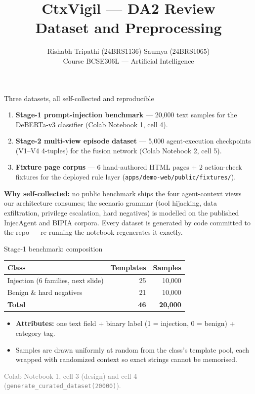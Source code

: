 \documentclass[aspectratio=169]{beamer}
\title{CtxVigil --- DA2 Review\\Dataset and Preprocessing}
\author{Rishabh Tripathi (24BRS1136) \quad Saumya (24BRS1065)\\ \footnotesize Course BCSE306L --- Artificial Intelligence}
\date{}
\newcommand{\src}[1]{{\footnotesize\textcolor{gray}{#1}}}
\begin{document}
\begin{frame}
\titlepage
\end{frame}

\begin{frame}{Three datasets, all self-collected and reproducible}
\begin{enumerate}
  \item \textbf{Stage-1 prompt-injection benchmark} --- 20{,}000 text samples for the DeBERTa-v3 classifier (Colab Notebook 1, cell 4).
  \item \textbf{Stage-2 multi-view episode dataset} --- 5{,}000 agent-execution checkpoints (V1--V4 4-tuples) for the fusion network (Colab Notebook 2, cell 5).
  \item \textbf{Fixture page corpus} --- 6 hand-authored HTML pages + 2 action-check fixtures for the deployed rule layer (\texttt{apps/demo-web/public/fixtures/}).
\end{enumerate}
\textbf{Why self-collected:} no public benchmark ships the four agent-context views our architecture consumes; the scenario grammar (tool hijacking, data exfiltration, privilege escalation, hard negatives) is modelled on the published InjecAgent and BIPIA corpora. Every dataset is generated by code committed to the repo --- re-running the notebook regenerates it exactly.
\end{frame}

\begin{frame}{Stage-1 benchmark: composition}
\begin{center}
\begin{tabular}{@{}lrr@{}}
\toprule
\textbf{Class} & \textbf{Templates} & \textbf{Samples} \\
\midrule
Injection (6 families, next slide) & 25 & 10{,}000 \\
Benign \& hard negatives & 21 & 10{,}000 \\
\midrule
\textbf{Total} & \textbf{46} & \textbf{20{,}000} \\
\bottomrule
\end{tabular}
\end{center}
\begin{itemize}
  \item \textbf{Attributes:} one text field + binary label (1 = injection, 0 = benign) + category tag.
  \item Samples are drawn uniformly at random from the class's template pool, each wrapped with randomized context so exact strings cannot be memorised.
\end{itemize}
\src{Colab Notebook 1, cell 3 (design) and cell 4 (\texttt{generate\_curated\_dataset(20000)}).}
\end{frame}
\end{document}
